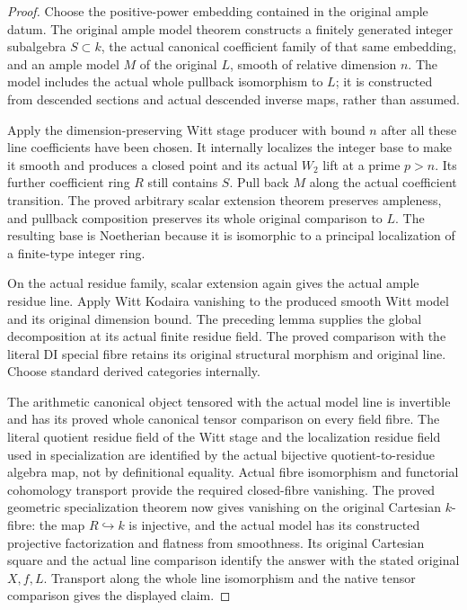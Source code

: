 \begin{proof}
Choose the positive-power embedding contained in the original ample datum.
The original ample model theorem constructs a finitely generated integer
subalgebra $S\subset k$, the actual canonical coefficient family of that
same embedding, and an ample model $M$ of the original $L$, smooth of
relative dimension $n$.  The model includes the actual whole pullback
isomorphism to $L$; it is constructed from descended sections and actual
descended inverse maps, rather than assumed.

Apply the dimension-preserving Witt stage producer with bound $n$ after
all these line coefficients have been chosen.  It internally localizes
the integer base to make it smooth and produces a closed point and its
actual $W_2$ lift at a prime $p>n$.  Its further coefficient ring $R$ still
contains $S$.  Pull back $M$ along the actual coefficient transition.
The proved arbitrary scalar extension theorem preserves ampleness, and
pullback composition preserves its whole original comparison to $L$.
The resulting base is Noetherian because it is isomorphic to a principal
localization of a finite-type integer ring.

On the actual residue family, scalar extension again gives the actual
ample residue line.  Apply Witt Kodaira vanishing to the produced smooth
Witt model and its original dimension bound. The preceding lemma supplies
the global decomposition at its actual finite residue field. The proved comparison with the literal DI
special fibre retains its original structural morphism and original line.
Choose standard derived categories internally.

The arithmetic canonical object tensored with the actual model line is
invertible and has its proved whole canonical tensor comparison on every
field fibre.  The literal quotient residue field of the Witt stage and
the localization residue field used in specialization are identified by
the actual bijective quotient-to-residue algebra map, not by definitional
equality.  Actual fibre isomorphism and functorial cohomology transport
provide the required closed-fibre vanishing.  The proved geometric
specialization theorem now gives vanishing on the original Cartesian
$k$-fibre: the map $R\hookrightarrow k$ is injective, and the actual model
has its constructed projective factorization and flatness from smoothness.
Its original Cartesian square and the actual line comparison identify the
answer with the stated original $X,f,L$.  Transport along the whole line
isomorphism and the native tensor comparison gives the displayed claim.
\end{proof}
